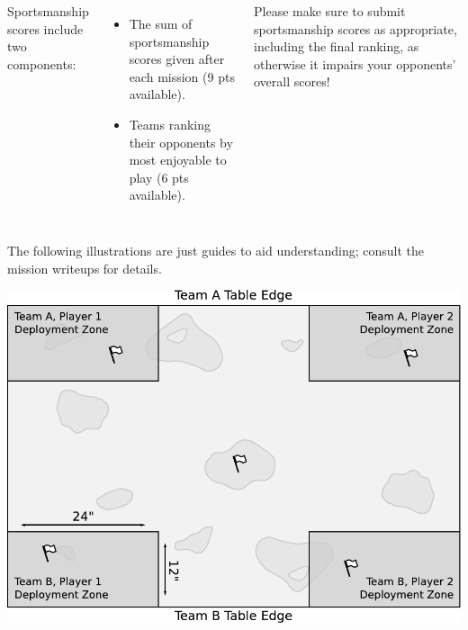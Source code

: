 \documentclass{40k}
\begin{document}
\begin{columns}
Sportsmanship scores include two components:
\begin{itemize}\shortlist
\item The sum of sportsmanship scores given after each mission (9 pts
  available).

\item Teams ranking their opponents by most enjoyable to play (6 pts
  available).
\end{itemize}

Please make sure to submit sportsmanship scores as appropriate,
including the final ranking, as otherwise it impairs your opponents'
overall scores!

\end{columns}



\clearpage
{}

The following illustrations are just guides to aid understanding;
consult the mission writeups for details.


\bigskip\centerline{\includegraphics[scale=0.6]{maps/mission1}}

\end{document}

